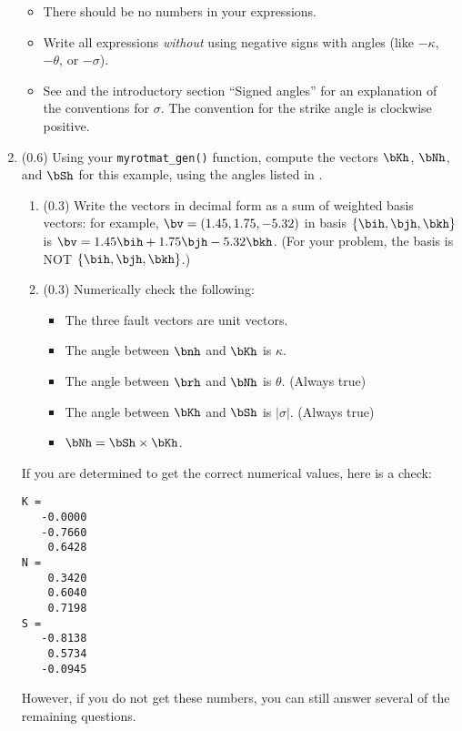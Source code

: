 \documentclass[11pt,titlepage,fleqn]{article}
\newcommand{\rotvec}{\bv}      %
\begin{document}
\begin{enumerate}
\begin{itemize}
\item There should be no numbers in your expressions.

\item Write all expressions {\em without} using negative signs with angles (like $-\kappa$, $-\theta$, or $-\sigma$).

\item See  and the introductory section ``Signed angles'' for an explanation of the conventions for $\sigma$. The convention for the strike angle is clockwise positive.
\end{itemize}


\item (0.6) Using your \verb+myrotmat_gen()+ function, compute the vectors $\bKh$, $\bNh$, and $\bSh$ for this example, using the angles listed in .
%
\begin{enumerate}
\item (0.3) Write the vectors in decimal form as a sum of weighted basis vectors: for example, $\bv = (1.45,1.75,-5.32)$ in basis $\{\bih,\bjh,\bkh\}$ is $\rotvec = 1.45\bih + 1.75\bjh - 5.32\bkh$. (For your problem, the basis is NOT $\{\bih,\bjh,\bkh\}$.)

\item (0.3) Numerically check the following:
%
\begin{itemize}
\item The three fault vectors are unit vectors.
\item The angle between $\bnh$ and $\bKh$ is $\kappa$.
\item The angle between $\brh$ and $\bNh$ is $\theta$. (Always true)
\item The angle between $\bKh$ and $\bSh$ is $|\sigma|$. (Always true)
\item $\bNh = \bSh \times \bKh$.
\end{itemize}

\end{enumerate}
%
If you are determined to get the correct numerical values, here is a check:
%
\begin{verbatim}
K =
   -0.0000
   -0.7660
    0.6428
N =
    0.3420
    0.6040
    0.7198
S =
   -0.8138
    0.5734
   -0.0945
\end{verbatim}
%
However, if you do not get these numbers, you can still answer several of the remaining questions.


\end{enumerate}
\end{document}
